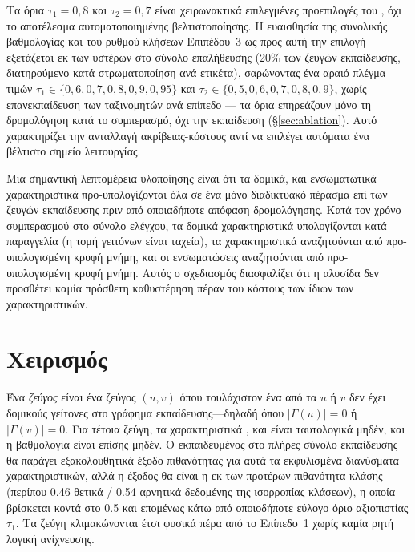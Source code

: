 Τα όρια $\tau_1 = 0{,}8$ και $\tau_2 = 0{,}7$ είναι χειρωνακτικά επιλεγμένες
προεπιλογές του \texttt{}, όχι το αποτέλεσμα αυτοματοποιημένης
βελτιστοποίησης.
Η ευαισθησία της συνολικής βαθμολογίας  και του
ρυθμού κλήσεων Επιπέδου~3 ως προς αυτή την επιλογή εξετάζεται εκ των υστέρων στο
σύνολο επαλήθευσης (20\% των ζευγών εκπαίδευσης, διατηρούμενο κατά στρωματοποίηση
ανά ετικέτα), σαρώνοντας ένα αραιό πλέγμα τιμών $\tau_1 \in \{0{,}6, 0{,}7, 0{,}8,
0{,}9, 0{,}95\}$ και $\tau_2 \in \{0{,}5, 0{,}6, 0{,}7, 0{,}8, 0{,}9\}$, χωρίς
επανεκπαίδευση των ταξινομητών ανά επίπεδο --- τα όρια επηρεάζουν μόνο τη
δρομολόγηση κατά το συμπερασμό, όχι την εκπαίδευση (\S\ref{sec:ablation}). Αυτό
χαρακτηρίζει την ανταλλαγή ακρίβειας-κόστους αντί να επιλέγει αυτόματα ένα
βέλτιστο σημείο λειτουργίας.

Μια σημαντική λεπτομέρεια υλοποίησης είναι ότι τα δομικά,  και
ενσωματωτικά χαρακτηριστικά προ-υπολογίζονται όλα σε ένα μόνο διαδικτυακό πέρασμα
επί των ζευγών εκπαίδευσης πριν από οποιαδήποτε απόφαση δρομολόγησης.
Κατά τον
χρόνο συμπερασμού στο σύνολο ελέγχου, τα δομικά χαρακτηριστικά υπολογίζονται
κατά παραγγελία (η τομή γειτόνων είναι ταχεία), τα χαρακτηριστικά 
αναζητούνται από προ-υπολογισμένη κρυφή μνήμη, και οι ενσωματώσεις αναζητούνται
από προ-υπολογισμένη κρυφή μνήμη.
Αυτός ο σχεδιασμός διασφαλίζει ότι η αλυσίδα
δεν προσθέτει καμία πρόσθετη καθυστέρηση πέραν του κόστους των ίδιων των
χαρακτηριστικών.


\section{Χειρισμός }
\label{sec:cold-start}

Ένα \textit{ζεύγος } είναι ένα ζεύγος $(u, v)$ όπου
τουλάχιστον ένα από τα $u$ ή $v$ δεν έχει δομικούς γείτονες στο γράφημα
εκπαίδευσης---δηλαδή όπου $|\Gamma(u)| = 0$ ή $|\Gamma(v)| = 0$.
Για τέτοια ζεύγη,
τα χαρακτηριστικά ,  και  είναι
ταυτολογικά μηδέν, και η βαθμολογία  είναι επίσης μηδέν.
Ο  εκπαιδευμένος στο πλήρες σύνολο εκπαίδευσης θα παράγει
εξακολουθητικά έξοδο πιθανότητας για αυτά τα εκφυλισμένα διανύσματα χαρακτηριστικών,
αλλά η έξοδος θα είναι η εκ των προτέρων πιθανότητα κλάσης (περίπου 0.46 θετικά /
0.54 αρνητικά δεδομένης της ισορροπίας κλάσεων), η οποία βρίσκεται κοντά στο 0.5
και επομένως κάτω από οποιοδήποτε εύλογο όριο αξιοπιστίας $\tau_1$.
Τα ζεύγη
 κλιμακώνονται έτσι φυσικά πέρα από το Επίπεδο~1 χωρίς
καμία ρητή λογική ανίχνευσης.

